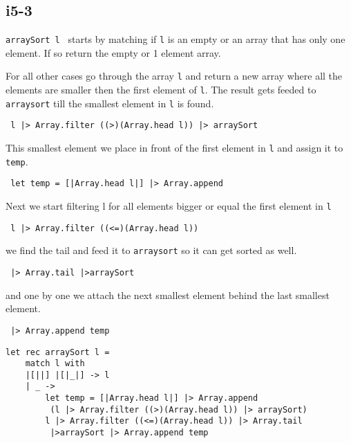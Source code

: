\subsection{i5-3}

\verb|arraySort l | starts by matching if \verb|l| is an empty or an array that has only one element. If so return the empty or 1 element array.

For all other cases go through the array \verb|l| and return a new array where all the elements are smaller then the first element of \verb|l|. The result gets feeded to \verb|arraysort| till the smallest element in \verb|l| is found.

\begin{verbatim} l |> Array.filter ((>)(Array.head l)) |> arraySort\end{verbatim} 

This smallest element we place in front of the first element in \verb|l| and assign it to \verb|temp|.

\begin{verbatim} let temp = [|Array.head l|] |> Array.append \end{verbatim}

Next we start filtering l for all elements bigger or equal the first element in \verb|l| 

\begin{verbatim} l |> Array.filter ((<=)(Array.head l)) \end{verbatim}

we find the tail and feed it to \verb|arraysort| so it can get sorted as well.

\begin{verbatim} |> Array.tail |>arraySort \end{verbatim}

and one by one we attach the next smallest element behind the last smallest element.

\begin{verbatim} |> Array.append temp \end{verbatim}


\lstset{}
\begin{lstlisting}
let rec arraySort l = 
    match l with
    |[||] |[|_|] -> l
    | _ -> 
        let temp = [|Array.head l|] |> Array.append 
       	 (l |> Array.filter ((>)(Array.head l)) |> arraySort)
        l |> Array.filter ((<=)(Array.head l)) |> Array.tail 
         |>arraySort |> Array.append temp

\end{lstlisting}

